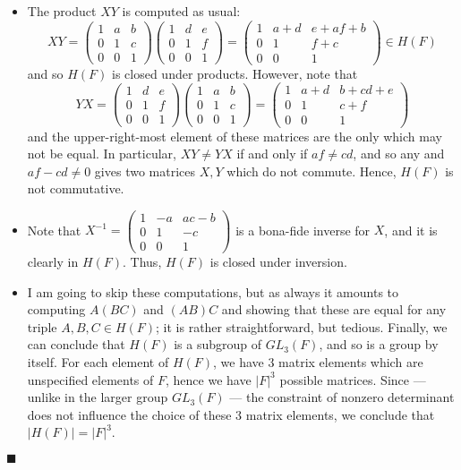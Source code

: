 \documentclass[12pt]{article}
\renewcommand{\qed}{\hfill$\blacksquare$}
\renewenvironment{proof}{\begin{addmargin}[1em]{0em}\begin{newproof}}{\end{newproof}\end{addmargin}\qed}
\begin{document}
\begin{proof}
\begin{itemize}
    \item The product $XY$ is computed as usual:
    $$ XY = \left(\begin{array}{ccc} 1 & a & b \\ 0 & 1 & c \\ 0 & 0 & 1 \end{array}\right)\left(\begin{array}{ccc} 1 & d & e \\ 0 & 1 & f \\ 0 & 0 & 1 \end{array}\right)=\left(\begin{array}{ccc} 1 & a+d & e+af+b \\ 0 & 1 & f+c \\ 0 & 0 & 1 \end{array}\right) \in H\left(F\right) $$ and so $H\left(F\right)$ is closed under products. However, note that
    $$ YX = \left(\begin{array}{ccc} 1 & d & e \\ 0 & 1 & f \\ 0 & 0 & 1 \end{array}\right)\left(\begin{array}{ccc} 1 & a & b \\ 0 & 1 & c \\ 0 & 0 & 1 \end{array}\right)=\left(\begin{array}{ccc} 1 & a+d & b+cd+e \\ 0 & 1 & c+f \\ 0 & 0 & 1 \end{array}\right) $$ and the upper-right-most element of these matrices are the only which may not be equal. In particular, $XY\neq YX$ if and only if $af \neq cd$, and so any and $af-cd \neq 0$ gives two matrices $X,Y$ which do not commute. Hence, $H\left(F\right)$ is not commutative.
    \item Note that $X^{-1} = \left(\begin{array}{ccc} 1 & -a & ac-b \\ 0 & 1 & -c \\ 0 & 0 & 1 \end{array}\right)$ is a bona-fide inverse for $X$, and it is clearly in $H\left(F\right)$. Thus, $H\left(F\right)$ is closed under inversion.
    \item I am going to skip these computations, but as always it amounts to computing $A\left(BC\right)$ and $\left(AB\right)C$ and showing that these are equal for any triple $A,B,C\in H\left(F\right)$; it is rather straightforward, but tedious. Finally, we can conclude that $H\left(F\right)$ is a subgroup of $GL_3\left(F\right)$, and so is a group by itself. For each element of $H\left(F\right)$, we have 3 matrix elements which are unspecified elements of $F$, hence we have $\left|F\right|^3$ possible matrices. Since --- unlike in the larger group $GL_3\left(F\right)$ --- the constraint of nonzero determinant does not influence the choice of these 3 matrix elements, we conclude that $\left|H\left(F\right)\right| = \left|F\right|^3$.

\end{itemize}
\end{proof}
\end{document}
